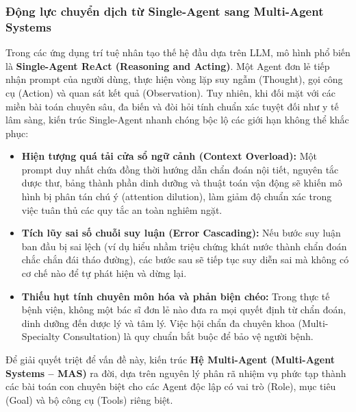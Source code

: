 \documentclass[12pt,a4paper]{article}
\begin{document}
\subsubsection{Động lực chuyển dịch từ Single-Agent sang Multi-Agent Systems}
Trong các ứng dụng trí tuệ nhân tạo thế hệ đầu dựa trên LLM, mô hình phổ biến là \textbf{Single-Agent ReAct (Reasoning and Acting)}. Một Agent đơn lẻ tiếp nhận prompt của người dùng, thực hiện vòng lặp suy ngẫm (Thought), gọi công cụ (Action) và quan sát kết quả (Observation). Tuy nhiên, khi đối mặt với các miền bài toán chuyên sâu, đa biến và đòi hỏi tính chuẩn xác tuyệt đối như y tế lâm sàng, kiến trúc Single-Agent nhanh chóng bộc lộ các giới hạn không thể khắc phục:
\begin{itemize}[leftmargin=1.2cm]
    \item \textbf{Hiện tượng quá tải cửa sổ ngữ cảnh (Context Overload):} Một prompt duy nhất chứa đồng thời hướng dẫn chẩn đoán nội tiết, nguyên tắc dược thư, bảng thành phần dinh dưỡng và thuật toán vận động sẽ khiến mô hình bị phân tán chú ý (attention dilution), làm giảm độ chuẩn xác trong việc tuân thủ các quy tắc an toàn nghiêm ngặt.
    \item \textbf{Tích lũy sai số chuỗi suy luận (Error Cascading):} Nếu bước suy luận ban đầu bị sai lệch (ví dụ hiểu nhầm triệu chứng khát nước thành chẩn đoán chắc chắn đái tháo đường), các bước sau sẽ tiếp tục suy diễn sai mà không có cơ chế nào để tự phát hiện và dừng lại.
    \item \textbf{Thiếu hụt tính chuyên môn hóa và phản biện chéo:} Trong thực tế bệnh viện, không một bác sĩ đơn lẻ nào đưa ra mọi quyết định từ chẩn đoán, dinh dưỡng đến dược lý và tâm lý. Việc hội chẩn đa chuyên khoa (Multi-Specialty Consultation) là quy chuẩn bắt buộc để bảo vệ người bệnh.
\end{itemize}

Để giải quyết triệt để vấn đề này, kiến trúc \textbf{Hệ Multi-Agent (Multi-Agent Systems -- MAS)} ra đời, dựa trên nguyên lý phân rã nhiệm vụ phức tạp thành các bài toán con chuyên biệt cho các Agent độc lập có vai trò (Role), mục tiêu (Goal) và bộ công cụ (Tools) riêng biệt.
\end{document}
